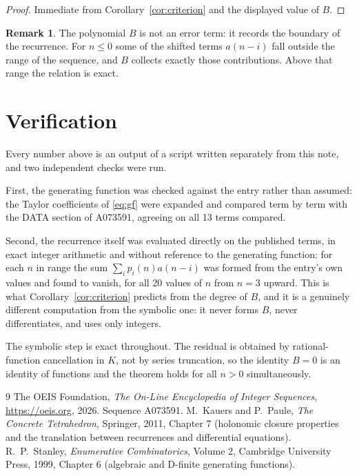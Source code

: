 \documentclass[11pt,a4paper]{article}
\theoremstyle{plain}
\theoremstyle{definition}
\newtheorem{remark}[theorem]{Remark}
\begin{document}
\begin{proof}
Immediate from Corollary~\ref{cor:criterion} and the displayed value of $B$.
\end{proof}

\begin{remark}
The polynomial $B$ is not an error term: it records the boundary of the recurrence. For
$n\le0$ some of the shifted terms $a(n-i)$ fall outside the range of the sequence,
and $B$ collects exactly those contributions. Above that range the relation is exact.
\end{remark}

\section{Verification}

Every number above is an output of a script written separately from this note, and two
independent checks were run.

First, the generating function was checked against the entry rather than assumed: the
Taylor coefficients of \eqref{eq:gf} were expanded and compared term by term with the DATA
section of A073591, agreeing on all 13 terms compared.

Second, the recurrence itself was evaluated directly on the published terms, in exact
integer arithmetic and without reference to the generating function: for each $n$ in range
the sum $\sum_{i}p_{i}(n)a(n-i)$ was formed from the entry's own values and found to
vanish, for all 20 values of $n$ from $n=3$ upward. This is what
Corollary~\ref{cor:criterion} predicts from the degree of $B$, and it is a genuinely
different computation from the symbolic one: it never forms $B$, never differentiates, and
uses only integers.

The symbolic step is exact throughout. The residual is obtained by rational-function
cancellation in $K$, not by series truncation, so the identity $B=0$ is an
identity of functions and the theorem holds for all $n>0$ simultaneously.

\begin{thebibliography}{9}
 The OEIS Foundation, \emph{The On-Line Encyclopedia of Integer Sequences},
\url{https://oeis.org}, 2026. Sequence A073591.
 M.~Kauers and P.~Paule, \emph{The Concrete Tetrahedron}, Springer, 2011,
Chapter 7 (holonomic closure properties and the translation between recurrences and
differential equations).
 R.~P.~Stanley, \emph{Enumerative Combinatorics}, Volume 2, Cambridge
University Press, 1999, Chapter 6 (algebraic and D-finite generating functions).
\end{thebibliography}
\end{document}

